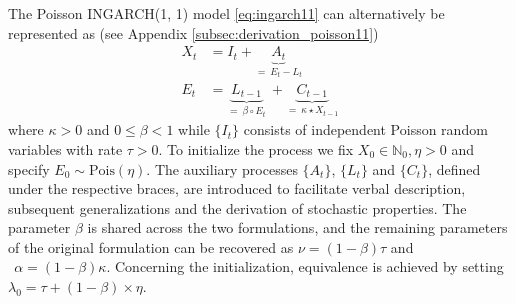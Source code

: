 \documentclass{article}
\begin{document}
The Poisson INGARCH(1, 1) model \eqref{eq:ingarch11} can alternatively be represented as (see Appendix \ref{subsec:derivation_poisson11})
\begin{align}
X_t & = I_t + \underbrace{A_t}_{=\ E_t - L_t} \label{eq:X_t_thinning_Poisson}\\
E_t & = \underbrace{L_{t - 1}}_{=\ \beta \circ E_t} \ + \underbrace{C_{t - 1}}_{=\ \kappa \star X_{t - 1}}\label{eq:E_t_thinning_Poisson}%
\end{align}
where $\kappa > 0$ and $0 \leq \beta < 1$ while $\{I_t\}$ consists of independent Poisson random variables with rate $\tau > 0$. To initialize the process we fix $X_0 \in \mathbb{N}_0 , \eta > 0$ and specify $E_0 \sim \text{Pois}(\eta)$. The auxiliary processes $\{A_t\}$, $\{L_t\}$ and $\{C_t\}$, defined under the respective braces, are introduced to facilitate verbal description, subsequent generalizations and the derivation of stochastic properties. The parameter $\beta$ is shared across the two formulations, and the remaining parameters of the original formulation can be recovered as
$
\nu = (1 - \beta)\tau$ and $ \ \
\alpha = (1 - \beta)\kappa.
$
Concerning the initialization, equivalence is achieved by setting $\lambda_0 = \tau + (1 - \beta) \times \eta$.
\end{document}
